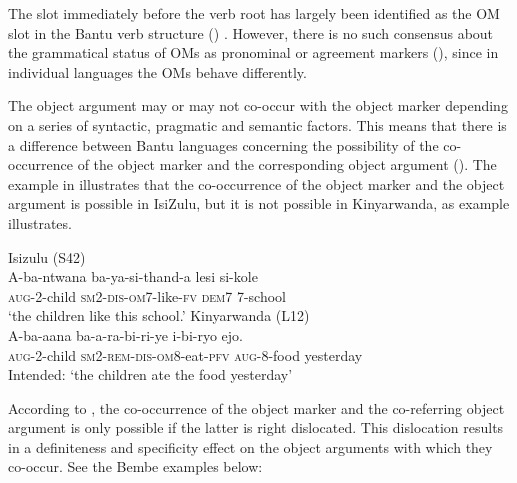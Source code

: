 \documentclass[output=paper]{langscibook}
\begin{document}
The slot immediately before the verb root has largely been identified as the OM slot in the Bantu verb structure (\citet{Ngunga2014}) . However, there is no such consensus about the grammatical status of OMs as pronominal or agreement markers (\citealt{BresnanMchombo1987, Deen2006, Riedel2009}), since in individual languages the OMs behave differently. 

The object argument may or may not co-occur with the object marker depending on a series of syntactic, pragmatic and semantic factors. This means that there is a difference between Bantu languages concerning the possibility of the co-occurrence of the object marker and the corresponding object argument (\citealt{Ngunga2014, Zeller2014}). The example in  illustrates that the co-occurrence of the object marker and the object argument is possible in IsiZulu, but it is not possible in Kinyarwanda, as example  illustrates. 

\ea\label{ex:ngunga:3} Isizulu (S42)  \citep[219]{Zeller2012} \\
\gll A-ba-ntwana  ba-ya-si-thand-a  lesi  si-kole\\
\textsc{aug}-2-{child}  \textsc{sm}2-\textsc{dis}-\textsc{om}7-{like}-{\textsc{fv}}   \textsc{dem}7  7-school\\
\glt ‘the children like this school.’
\ex\label{ex:ngunga:4} Kinyarwanda (L12)    \citep[76]{Riedel2009} \\
\gll * A-ba-aana  ba-a-ra-bi-ri-ye    i-bi-ryo  ejo.\\
     {} \textsc{aug}-{2}{}-{child}  \textsc{sm}2-\textsc{rem}-\textsc{dis}-\textsc{om}8-{eat}{}-{\textsc{pfv}}   \textsc{aug}-8-food  {yesterday}\\
\glt \phantom{*} Intended: ‘the children ate the food yesterday’
\z

According to \citet{Iorio2015}, the co-occurrence of the object marker and the co-referring object argument is only possible if the latter is right dislocated. This dislocation results in a definiteness and specificity effect on the object arguments with which they co-occur. See the Bembe examples below: 
\end{document}

